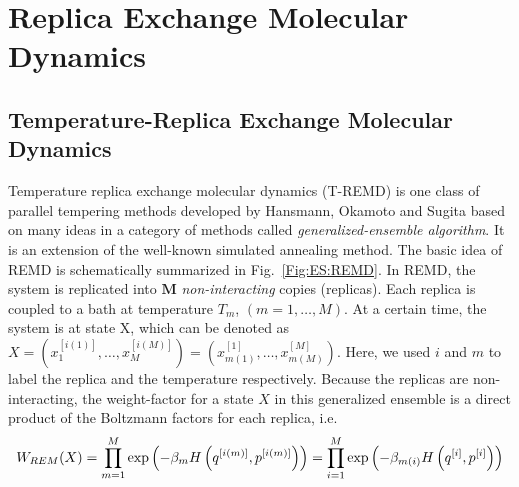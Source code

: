 \section{Replica Exchange Molecular Dynamics\label{Sec:ES:REMD}}
\subsection{Temperature-Replica Exchange Molecular Dynamics}
Temperature replica exchange molecular dynamics (T-REMD) is one class of parallel tempering methods developed by Hansmann, Okamoto and Sugita\cite{HansmannJCC1993,HansmannCPL1997,SugitaCPL1999} based on many ideas in a category of methods called \textit{generalized-ensemble algorithm}. It is an extension of the well-known simulated annealing method. The basic idea of REMD is schematically summarized in Fig.~\ref{Fig:ES:REMD}. In REMD, the system is replicated into $\mathbf{M}$ \textit{non-interacting} copies (replicas). Each replica is coupled to a bath at temperature $T_m$, $(m=1,\dots,M)$. At a certain time, the system is at state X, which can be denoted as $X=\left(x_1^{[i(1)]},\dots,x_M^{[i(M)]}\right)=\left(x_{m(1)}^{[1]},\dots,x_{m(M)}^{[M]}\right)$. Here, we used $i$ and $m$ to label the replica and the temperature respectively. Because the replicas are non-interacting, the weight-factor for a state $X$ in this generalized ensemble is a direct product of the Boltzmann factors for each replica, i.e.
\begin{equation}
	W_{REM}(X)=\prod\limits_{m=1}^M\exp{\left(-\beta_m H\left(q^{[i(m)]},p^{[i(m)]}\right)\right)}=\prod\limits_{i=1}^M \exp{\left(-\beta_{m(i)}H\left(q^{[i]},p^{[i]}\right)\right)}\textsl{}
\end{equation}

